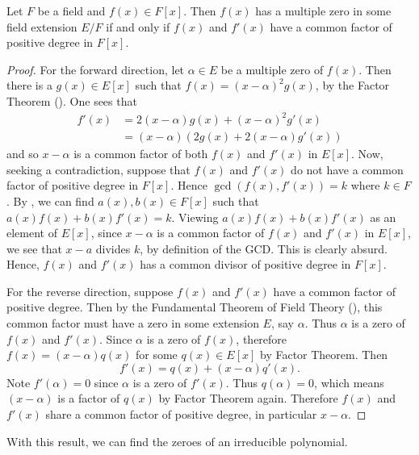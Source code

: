 \begin{theorem}\label{thrm-criterion-for-multiple-zeroes}
    Let $F$ be a field and $f(x) \in F[x]$. Then $f(x)$ has a multiple zero in some field extension $E/F$ if and only if $f(x)$ and $f'(x)$ have a common factor of positive degree in $F[x]$.
\end{theorem}
\begin{proof}
    For the forward direction, let $\alpha \in E$ be a multiple zero of $f(x)$. Then there is a $g(x) \in E[x]$ such that $f(x) = (x-\alpha)^2g(x)$, by the Factor Theorem (). One sees that
    \begin{align*}
        f'(x) &= 2(x-\alpha)g(x) + (x-\alpha)^2g'(x)\\
        &= (x-\alpha)\left(2g(x) + 2(x-\alpha)g'(x)\right)
    \end{align*}
    and so $x-\alpha$ is a common factor of both $f(x)$ and $f'(x)$ in $E[x]$. Now, seeking a contradiction, suppose that $f(x)$ and $f'(x)$ do not have a common factor of positive degree in $F[x]$. Hence $\gcd(f(x), f'(x)) = k$ where $k \in F$. By , we can find $a(x), b(x) \in F[x]$ such that $a(x)f(x) + b(x)f'(x) = k$. Viewing $a(x)f(x) + b(x)f'(x)$ as an element of $E[x]$, since $x-\alpha$ is a common factor of $f(x)$ and $f'(x)$ in $E[x]$, we see that $x-a$ divides $k$, by definition of the GCD. This is clearly absurd. Hence, $f(x)$ and $f'(x)$ has a common divisor of positive degree in $F[x]$.

    For the reverse direction, suppose $f(x)$ and $f'(x)$ have a common factor of positive degree. Then by the Fundamental Theorem of Field Theory (), this common factor must have a zero in some extension $E$, say $\alpha$. Thus $\alpha$ is a zero of $f(x)$ and $f'(x)$. Since $\alpha$ is a zero of $f(x)$, therefore $f(x) = (x-\alpha)q(x)$ for some $q(x) \in E[x]$ by Factor Theorem. Then
    \[
        f'(x) = q(x) + (x-\alpha)q'(x).
    \]
    Note $f'(\alpha) = 0$ since $\alpha$ is a zero of $f'(x)$. Thus $q(\alpha) = 0$, which means $(x-\alpha)$ is a factor of $q(x)$ by Factor Theorem again. Therefore $f(x)$ and $f'(x)$ share a common factor of positive degree, in particular $x-\alpha$.
\end{proof}

With this result, we can find the zeroes of an irreducible polynomial.

